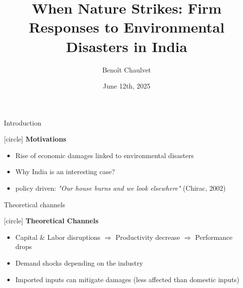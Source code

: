 \documentclass[
  xcolor=svgnames,
  bookmarks=true,
  bookmarksopen=true,
  pdfborder={0 0 0},
  pdfhighlight={/N},
  linkbordercolor={rgb}{0.5,0.5,0.5},
  implicit=false,
  colorlinks=true,
  allcolors=deepblue
]{beamer}
\title[When Nature Strikes]{\textbf{When Nature Strikes: Firm Responses to Environmental Disasters in India}}
\author[Benoît Chaulvet]{Benoît Chaulvet}
\institute[Université Paris 1]{Paris 1 Pantheon-Sorbonne University}
\date{June 12th, 2025}
\begin{document}
\begin{frame}
    \titlepage
\end{frame}

\begin{frame}{Introduction}
\large
{[circle]
\textbf{Motivations}
\begin{itemize}
    \item Rise of economic damages linked to environmental disasters
    \item Why India is an interesting case?
    \item policy driven: \textit{"Our house burns and we look elsewhere"} (Chirac, 2002)
\end{itemize}
}
\end{frame}


\begin{frame}{Theoretical channels}
\large
{[circle]
\textbf{Theoretical Channels}
\begin{itemize}
    \item Capital \& Labor disruptions $\Rightarrow$ Productivity decrease $\Rightarrow$ Performance drops
    \item Demand shocks depending on the industry
    \item Imported inputs can mitigate damages (less affected than domestic inputs)
\end{itemize}
}
\end{frame}
\end{document}
